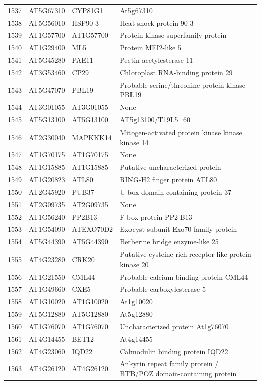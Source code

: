 \documentclass[11pt]{article}
\begin{document}
\begin{center}
\begin{tabular}{rlll}
1537 & AT5G67310 & CYP81G1 & At5g67310\\
1538 & AT5G56010 & HSP90-3 & Heat shock protein 90-3\\
1539 & AT1G57700 & AT1G57700 & Protein kinase superfamily protein\\
1540 & AT1G29400 & ML5 & Protein MEI2-like 5\\
1541 & AT5G45280 & PAE11 & Pectin acetylesterase 11\\
1542 & AT3G53460 & CP29 & Chloroplast RNA-binding protein 29\\
1543 & AT5G47070 & PBL19 & Probable serine/threonine-protein kinase PBL19\\
1544 & AT3G01055 & AT3G01055 & None\\
1545 & AT5G13100 & AT5G13100 & AT5g13100/T19L5\_60\\
1546 & AT2G30040 & MAPKKK14 & Mitogen-activated protein kinase kinase kinase 14\\
1547 & AT1G70175 & AT1G70175 & None\\
1548 & AT1G15885 & AT1G15885 & Putative uncharacterized protein\\
1549 & AT1G20823 & ATL80 & RING-H2 finger protein ATL80\\
1550 & AT2G45920 & PUB37 & U-box domain-containing protein 37\\
1551 & AT2G09735 & AT2G09735 & None\\
1552 & AT1G56240 & PP2B13 & F-box protein PP2-B13\\
1553 & AT1G54090 & ATEXO70D2 & Exocyst subunit Exo70 family protein\\
1554 & AT5G44390 & AT5G44390 & Berberine bridge enzyme-like 25\\
1555 & AT4G23280 & CRK20 & Putative cysteine-rich receptor-like protein kinase 20\\
1556 & AT1G21550 & CML44 & Probable calcium-binding protein CML44\\
1557 & AT1G49660 & CXE5 & Probable carboxylesterase 5\\
1558 & AT1G10020 & AT1G10020 & At1g10020\\
1559 & AT5G12880 & AT5G12880 & At5g12880\\
1560 & AT1G76070 & AT1G76070 & Uncharacterized protein At1g76070\\
1561 & AT4G14455 & BET12 & At4g14455\\
1562 & AT4G23060 & IQD22 & Calmodulin binding protein IQD22\\
1563 & AT4G26120 & AT4G26120 & Ankyrin repeat family protein / BTB/POZ domain-containing protein\\

\end{tabular}
\end{center}
\end{document}
